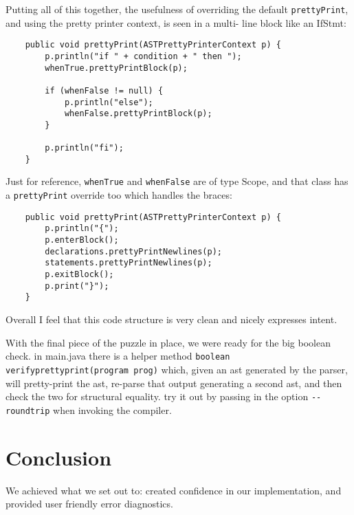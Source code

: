 \documentclass[oneside]{amsart}
\theoremstyle{definition}
\theoremstyle{remark}
\numberwithin{equation}{section}
\begin{document}
Putting all of this together, the usefulness of overriding the default
\texttt{prettyPrint}, and using the pretty printer context, is seen in a multi-
line block like an IfStmt:

\begin{lstlisting}
    public void prettyPrint(ASTPrettyPrinterContext p) {
        p.println("if " + condition + " then ");
        whenTrue.prettyPrintBlock(p);

        if (whenFalse != null) {
            p.println("else");
            whenFalse.prettyPrintBlock(p);
        }

        p.println("fi");
    }
\end{lstlisting}

Just for reference, \texttt{whenTrue} and \texttt{whenFalse} are of type Scope,
and that class has a \texttt{prettyPrint} override too which handles the braces:

\begin{lstlisting}
    public void prettyPrint(ASTPrettyPrinterContext p) {
        p.println("{");
        p.enterBlock();
        declarations.prettyPrintNewlines(p);
        statements.prettyPrintNewlines(p);
        p.exitBlock();
        p.print("}");
    }
\end{lstlisting}

Overall I feel that this code structure is very clean and nicely expresses
intent.

With the final piece of the puzzle in place, we were ready for the big boolean
check. in main.java there is a helper method \texttt{boolean
verifyprettyprint(program prog)} which, given an ast generated by the parser,
will pretty-print the ast, re-parse that output generating a second ast, and
then check the two for structural equality. try it out by passing in the option
\texttt{-{}-roundtrip} when invoking the compiler.

\section{Conclusion}
We achieved what we set out to: created confidence in our implementation, and
provided user friendly error diagnostics.

\end{document}
